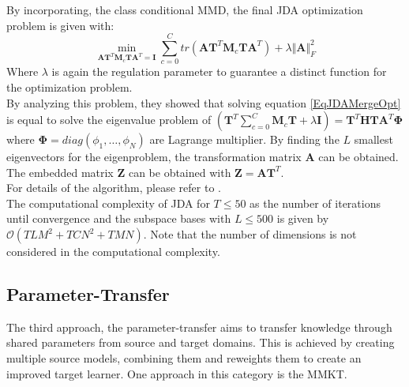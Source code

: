 By incorporating, the class conditional \acs{MMD}, the final \acs{JDA} optimization problem is given with:\cite{Long.}
\begin{equation}\label{EqJDAMergeOpt}
\min_{\mathbf{A}\mathbf{T}^T\mathbf{M}_c\mathbf{T}\mathbf{A}^T=\mathbf{I}} \sum_{c=0}^{C} tr(\mathbf{A}\mathbf{T}^T\mathbf{M}_c\mathbf{T}\mathbf{A}^T) + \lambda \Vert\mathbf{A}\Vert^2_F
\end{equation}
Where $\lambda$ is again the regulation parameter to guarantee a distinct function for the optimization problem.\\
By analyzing this problem, they showed that solving equation \eqref{EqJDAMergeOpt} is equal to solve the eigenvalue problem of $(\mathbf{T}^T\sum_{c=0}^{C}\mathbf{M}_c\mathbf{T}+\lambda\mathbf{I})=\mathbf{T}^T\mathbf{HT}\mathbf{A}^T\boldsymbol{\Phi}$ where $\boldsymbol{\Phi} = diag(\phi_1,\dots,\phi_N)$ are Lagrange multiplier. By finding the $L$ smallest eigenvectors for the eigenproblem, the transformation matrix $\mathbf{A}$ can be obtained. The embedded matrix $\mathbf{Z}$ can be obtained with $\mathbf{Z} = \mathbf{A}\mathbf{T}^T$.\cite{Long.}\\
For details of the algorithm, please refer to \cite{Long.}.\\
The computational complexity of \acs{JDA} for $T\le 50$ as the number of iterations until convergence and the subspace bases with $L\le 500$ is given by $\mathcal{O}(TLM^2+TCN^2+TMN)$.\cite{Long.}
Note that the number of dimensions is not considered in the computational complexity.
\subsection{Parameter-Transfer}\label{TlSubSecPara}
The third approach, the parameter-transfer aims to transfer knowledge through shared parameters from source and target domains.
This is achieved by creating multiple source models, combining them and reweights them to create an improved target learner.
One approach in this category is the \ac{MMKT}.\cite[p. 7-8]{Weiss.2016}

